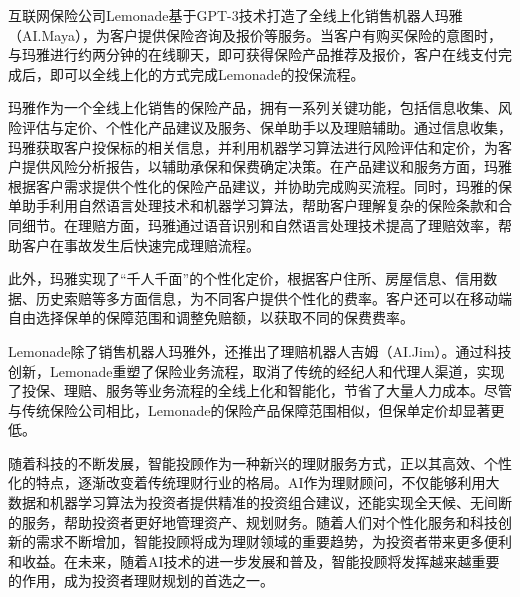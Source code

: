 互联网保险公司Lemonade基于GPT-3技术打造了全线上化销售机器人玛雅（AI.Maya），为客户提供保险咨询及报价等服务。当客户有购买保险的意图时，与玛雅进行约两分钟的在线聊天，即可获得保险产品推荐及报价，客户在线支付完成后，即可以全线上化的方式完成Lemonade的投保流程。

玛雅作为一个全线上化销售的保险产品，拥有一系列关键功能，包括信息收集、风险评估与定价、个性化产品建议及服务、保单助手以及理赔辅助。通过信息收集，玛雅获取客户投保标的相关信息，并利用机器学习算法进行风险评估和定价，为客户提供风险分析报告，以辅助承保和保费确定决策。在产品建议和服务方面，玛雅根据客户需求提供个性化的保险产品建议，并协助完成购买流程。同时，玛雅的保单助手利用自然语言处理技术和机器学习算法，帮助客户理解复杂的保险条款和合同细节。在理赔方面，玛雅通过语音识别和自然语言处理技术提高了理赔效率，帮助客户在事故发生后快速完成理赔流程。

此外，玛雅实现了“千人千面”的个性化定价，根据客户住所、房屋信息、信用数据、历史索赔等多方面信息，为不同客户提供个性化的费率。客户还可以在移动端自由选择保单的保障范围和调整免赔额，以获取不同的保费费率。

Lemonade除了销售机器人玛雅外，还推出了理赔机器人吉姆（AI.Jim）。通过科技创新，Lemonade重塑了保险业务流程，取消了传统的经纪人和代理人渠道，实现了投保、理赔、服务等业务流程的全线上化和智能化，节省了大量人力成本。尽管与传统保险公司相比，Lemonade的保险产品保障范围相似，但保单定价却显著更低。

随着科技的不断发展，智能投顾作为一种新兴的理财服务方式，正以其高效、个性化的特点，逐渐改变着传统理财行业的格局。AI作为理财顾问，不仅能够利用大数据和机器学习算法为投资者提供精准的投资组合建议，还能实现全天候、无间断的服务，帮助投资者更好地管理资产、规划财务。随着人们对个性化服务和科技创新的需求不断增加，智能投顾将成为理财领域的重要趋势，为投资者带来更多便利和收益。在未来，随着AI技术的进一步发展和普及，智能投顾将发挥越来越重要的作用，成为投资者理财规划的首选之一。
